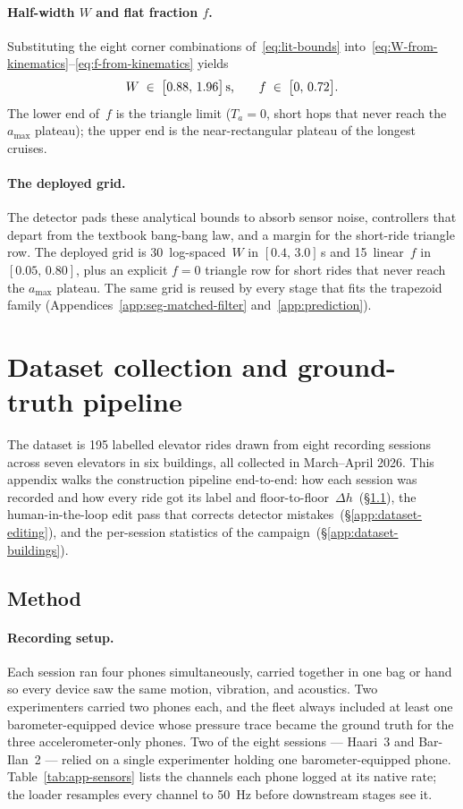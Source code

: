 \documentclass[manuscript,review,screen]{acmart}
\begin{document}
\paragraph{Half-width $W$ and flat fraction $f$.}
Substituting the eight corner combinations of~\eqref{eq:lit-bounds}
into~\eqref{eq:W-from-kinematics}--\eqref{eq:f-from-kinematics}
yields
\[
  W \;\in\;\bigl[0.88,\,1.96\bigr]\text{\,s,}\qquad
  f \;\in\;\bigl[0,\,0.72\bigr].
\]
The lower end of~$f$ is the triangle limit ($T_a\!=\!0$, short hops
that never reach the $a_{\max}$ plateau); the upper end is the
near-rectangular plateau of the longest cruises.

\paragraph{The deployed grid.}
The detector pads these analytical bounds to absorb sensor noise,
controllers that depart from the textbook bang-bang law, and a
margin for the short-ride triangle row.  The deployed grid is
30~log-spaced~$W$ in $[0.4,\,3.0]$\,s and 15~linear~$f$ in
$[0.05,\,0.80]$, plus an explicit $f\!=\!0$ triangle row for short
rides that never reach the $a_{\max}$ plateau.  The same grid is
reused by every stage that fits the trapezoid family
(Appendices~\ref{app:seg-matched-filter} and~\ref{app:prediction}).

\section{Dataset collection and ground-truth pipeline}
\label{app:dataset}

The dataset is 195 labelled elevator rides drawn from eight recording
sessions across seven elevators in six buildings, all collected in
March--April 2026. This appendix walks the construction pipeline
end-to-end: how each session was recorded and how every ride got its
label and floor-to-floor~$\Delta h$~(\S\ref{app:dataset-method}), the
human-in-the-loop edit pass that corrects detector
mistakes~(\S\ref{app:dataset-editing}), and the per-session statistics
of the campaign~(\S\ref{app:dataset-buildings}).

\subsection{Method}
\label{app:dataset-method}

\paragraph{Recording setup.}
Each session ran four phones simultaneously, carried together in one bag
or hand so every device saw the same motion, vibration, and acoustics.
Two experimenters carried two phones each, and the fleet always included
at least one barometer-equipped device whose pressure trace became the
ground truth for the three accelerometer-only phones. Two of the eight
sessions --- Haari~3 and Bar-Ilan~2 --- relied on a single
experimenter holding one barometer-equipped phone.
Table~\ref{tab:app-sensors} lists the channels each phone logged at its
native rate; the loader resamples every channel to 50~Hz before
downstream stages see it.
\end{document}
